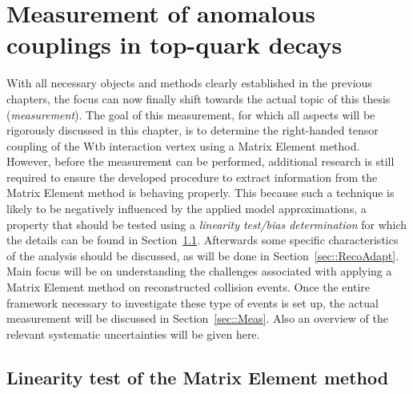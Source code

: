 \chapter{Measurement of anomalous couplings in top-quark decays} \label{ch::Analysis}

With all necessary objects and methods clearly established in the previous chapters, the focus can now finally shift towards the actual topic of this thesis (\textit{measurement}).
The goal of this measurement, for which all aspects will be rigorously discussed in this chapter, is to determine the right-handed tensor coupling of the Wtb interaction vertex using a Matrix Element method.
\\

However, before the measurement can be performed, additional research is still required to ensure the developed procedure to extract information from the Matrix Element method is behaving properly. This because such a technique is likely to be negatively influenced by the applied model approximations, a property that should be tested using a \textit{linearity test/bias determination} for which the details can be found in Section~\ref{sec::CalibCurve}.
Afterwards some specific characteristics of the analysis should be discussed, as will be done in Section~\ref{sec::RecoAdapt}.
Main focus will be on understanding the challenges associated with applying a Matrix Element method on reconstructed collision events.
Once the entire framework necessary to investigate these type of events is set up, the actual measurement will be discussed in Section~\ref{sec::Meas}. Also an overview of the relevant systematic uncertainties will be given here.

\section{Linearity test of the Matrix Element method} \label{sec::CalibCurve}

